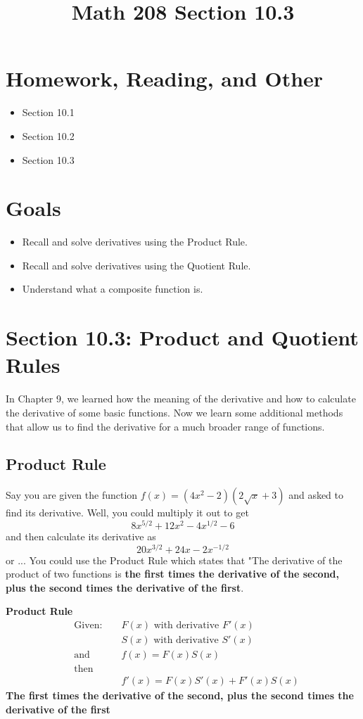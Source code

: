\documentclass[14pt]{extarticle}
\title{\vspace{-5ex}Math 208 Section 10.3}
\date{\vspace{-10ex}}
\begin{document}
	\maketitle		
	\section*{Homework, Reading, and Other}
	\begin{itemize}
		\item Section 10.1
		\item Section 10.2
		\item Section 10.3
	\end{itemize}

\section{Goals}
\begin{itemize}
	\item Recall and solve derivatives using the Product Rule.
	\item Recall and solve derivatives using the Quotient Rule.
	\item Understand what a composite function is.
\end{itemize}

\section{Section 10.3: Product and Quotient Rules}
In Chapter 9, we learned how the meaning of the derivative and how to calculate the derivative of some basic functions. Now we learn some additional methods that allow us to find the derivative for a much broader range of functions.

\subsection*{Product Rule}

Say you are given the function $f(x) = (4x^2 -2)(2\sqrt{x}+3)$ and asked to find its derivative. Well, you could multiply it out to get $$8x^{5/2} + 12x^2 - 4x^{1/2} - 6$$
and then calculate its derivative as $$20x^{3/2}+ 24x - 2x^{-1/2}$$ or ... You could use the Product Rule which states that "The derivative of the product of two functions is \textbf{the first times the derivative of the second, plus the second times the derivative of the first}. 

\begin{tcolorbox}[enhanced jigsaw,colback=bg,boxrule=0pt,arc=0pt]
	\textbf{Product Rule}
	\begin{align*}
		&\text{Given: } & &F(x) \text{ with derivative } F'(x) \\
		& & &S(x) \text{ with derivative } S'(x) \\
		&\text{and } & &f(x) = F(x)S(x) \\
		&\text{then }\\
		& & &f'(x) = F(x)S'(x) + F'(x)S(x)
	\end{align*}
\textbf{The first times the derivative of the second, plus the second times the derivative of the first}
\end{tcolorbox}
\end{document}
